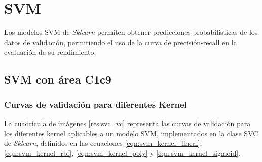 \section{SVM}

Los modelos SVM de \textit{Sklearn} permiten obtener predicciones probabilísticas de los datos de validación, permitiendo el uso de la curva de precisión-recall en la evaluación de su rendimiento.

\subsection{SVM con área C1c9}

\subsubsection{Curvas de validación para diferentes Kernel}

La cuadrícula de imágenes \ref{res:svc_vc} representa las curvas de validación para los diferentes kernel aplicables a un modelo SVM, implementados en la clase SVC de \textit{Sklearn}, definidos en las ecuaciones \ref{eqn:svm_kernel_lineal}, \ref{eqn:svm_kernel_rbf}, \ref{eqn:svm_kernel_poly} y \ref{eqn:svm_kernel_sigmoid}.

